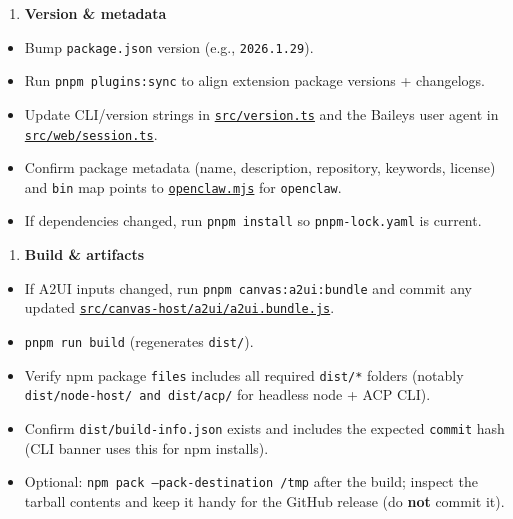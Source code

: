 \begin{enumerate}
  \item \textbf{Version \& metadata}
\end{enumerate}


\begin{itemize}
  \item [ ] Bump \texttt{package.json} version (e.g., \texttt{2026.1.29}).
  \item [ ] Run \texttt{pnpm plugins:sync} to align extension package versions + changelogs.
  \item [ ] Update CLI/version strings in \href{https://github.com/openclaw/openclaw/blob/main/src/version.ts}{\texttt{src/version.ts}} and the Baileys user agent in \href{https://github.com/openclaw/openclaw/blob/main/src/web/session.ts}{\texttt{src/web/session.ts}}.
  \item [ ] Confirm package metadata (name, description, repository, keywords, license) and \texttt{bin} map points to \href{https://github.com/openclaw/openclaw/blob/main/openclaw.mjs}{\texttt{openclaw.mjs}} for \texttt{openclaw}.
  \item [ ] If dependencies changed, run \texttt{pnpm install} so \texttt{pnpm-lock.yaml} is current.
\end{itemize}


\begin{enumerate}
  \item \textbf{Build \& artifacts}
\end{enumerate}


\begin{itemize}
  \item [ ] If A2UI inputs changed, run \texttt{pnpm canvas:a2ui:bundle} and commit any updated \href{https://github.com/openclaw/openclaw/blob/main/src/canvas-host/a2ui/a2ui.bundle.js}{\texttt{src/canvas-host/a2ui/a2ui.bundle.js}}.
  \item [ ] \texttt{pnpm run build} (regenerates \texttt{dist/}).
  \item [ ] Verify npm package \texttt{files} includes all required \texttt{dist/*} folders (notably \texttt{dist/node-host/\textbf{} and \texttt{dist/acp/}} for headless node + ACP CLI).
  \item [ ] Confirm \texttt{dist/build-info.json} exists and includes the expected \texttt{commit} hash (CLI banner uses this for npm installs).
  \item [ ] Optional: \texttt{npm pack --pack-destination /tmp} after the build; inspect the tarball contents and keep it handy for the GitHub release (do \textbf{not} commit it).
\end{itemize}


